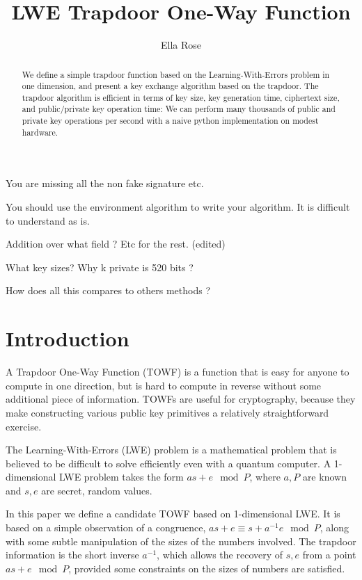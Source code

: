 \documentclass[preprint]{iacrtrans}
\author{Ella Rose}
\institute{Paso Robles, CA \email{python_pride@protonmail.com}}
\title[LWE Trapdoor One-Way Function]{LWE Trapdoor One-Way Function}
\begin{document}
\maketitle


\begin{abstract}
 We define a simple trapdoor function based on the Learning-With-Errors problem in one dimension, and present a key exchange algorithm based on the trapdoor. The trapdoor algorithm is efficient in terms of key size, key generation time, ciphertext size, and public/private key operation time: We can perform many thousands of public and private key operations per second with a naive python implementation on modest hardware. 
 \end{abstract}

\todototoc
\listoftodos
You are missing all the non fake signature etc.

You should use the environment algorithm to write your algorithm. It is difficult to understand as is.

Addition over what field ? Etc for the rest. (edited)

What key sizes? Why k private is 520 bits ?

How does all this compares to others methods ?

\section{Introduction}
A Trapdoor One-Way Function (TOWF) is a function that is easy for anyone to compute in one direction, but is hard to compute in reverse without some additional piece of information. TOWFs are useful for cryptography, because they make constructing various public key primitives a relatively straightforward exercise.

The Learning-With-Errors (LWE) problem is a mathematical problem that is believed to be difficult to solve efficiently even with a quantum computer. A 1-dimensional LWE problem takes the form $a s + e \mod P$, where $a, P$ are known and $s, e$ are secret, random values.

In this paper we define a candidate TOWF based on 1-dimensional LWE. It is based on a simple observation of a congruence, $a s + e \equiv s + a^{-1} e \mod P$, along with some subtle manipulation of the sizes of the numbers involved. The trapdoor information is the short inverse $a^{-1}$, which allows the recovery of $s, e$ from a point $a s + e \mod P$, provided some constraints on the sizes of numbers are satisfied.
\end{document}
